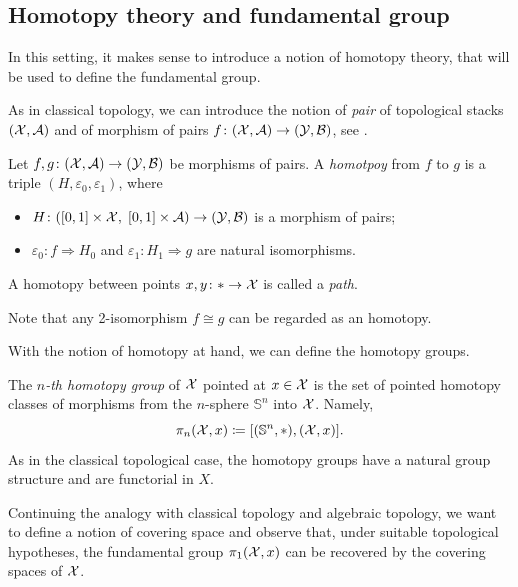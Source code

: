 \subsection{Homotopy theory and fundamental group}

In this setting, it makes sense to introduce a notion of homotopy theory, that will be used to define the fundamental group.

As in classical topology, we can introduce the notion of \textit{pair} of topological stacks $(\mathcal{X}, \mathcal{A})$ and of morphism of pairs $f\colon (\mathcal{X}, \mathcal{A}) \to (\mathcal{Y}, \mathcal{B})$, see \cite[Definition 17.1]{Noohi-foundations}.

\begin{defi}\cite[Definition 17.2]{Noohi-foundations}
Let $f, g \colon (\mathcal{X}, \mathcal{A}) \to (\mathcal{Y}, \mathcal{B})$ be morphisms of pairs. A \textit{homotpoy} from $f$ to $g$ is a triple $(H, \varepsilon_0, \varepsilon_1)$, where
\begin{itemize}
    \item $H \colon ([0, 1] \times \mathcal{X}, \; [0, 1] \times \mathcal{A}) \to (\mathcal{Y}, \mathcal{B})$ is a morphism of pairs;
    \item $\varepsilon_0 \colon f \Rightarrow H_0$ and $\varepsilon_1 \colon H_1 \Rightarrow g$ are natural isomorphisms.
\end{itemize}
A homotopy between points $x, y \colon * \to \mathcal{X}$ is called a \textit{path}.
\end{defi}

\begin{rmk}\cite[Remark 17.3]{Noohi-foundations}
Note that any 2-isomorphism $f \cong g$ can be regarded as an homotopy.
\end{rmk}

With the notion of homotopy at hand, we can define the homotopy groups.

\begin{defi}\cite[Definition 17.5]{Noohi-foundations}
The \textit{$n$-th homotopy group} of $\mathcal{X}$ pointed at $x \in \mathcal{X}$ is the set of pointed homotopy classes of morphisms from the $n$-sphere $\mathbb{S}^n$ into $\mathcal{X}$. Namely,
\[
\pi_n(\mathcal{X}, x) \coloneqq [(\mathbb{S}^n, *), (\mathcal{X}, x)].
\]
As in the classical topological case, the homotopy groups have a natural group structure and are functorial in $X$.
\end{defi}


Continuing the analogy with classical topology and algebraic topology, we want to define a notion of covering space and observe that, under suitable topological hypotheses, the fundamental group $\pi_1(\mathcal{X}, x)$ can be recovered by the covering spaces of $\mathcal{X}$.

